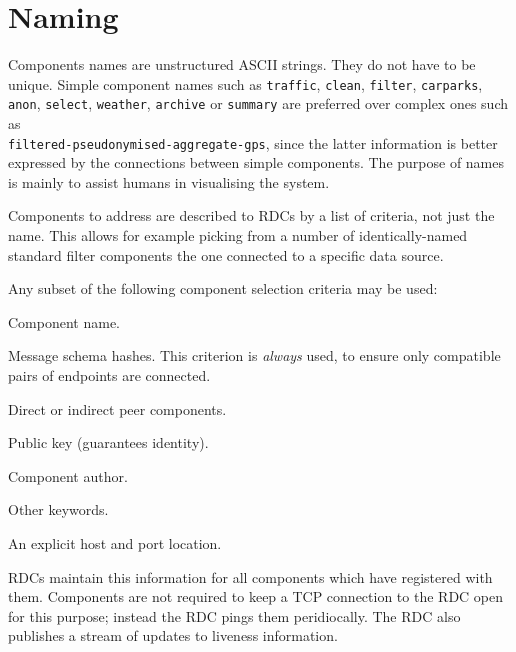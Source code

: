 \documentclass[12pt,a4paper,twoside]{article}
\renewcommand{\_}{\texttt{\symbol{95}}}
\begin{document}
\section{Naming}

Components names are unstructured ASCII strings. They do not have to
be unique. Simple component names such as
\verb^traffic^, \verb^clean^, \verb^filter^, \verb^carparks^,
\verb^anon^, \verb^select^, \verb^weather^, \verb^archive^ or
\verb^summary^ are preferred over complex ones such as\\
\verb^filtered-pseudonymised-aggregate-gps^, since the latter
information is better expressed by the connections between simple
components.
The purpose of names is mainly to assist humans in
visualising the system.

Components to address are described to RDCs by a list of
criteria, not just the name. This allows for example picking from
a number of identically-named standard filter components the one
connected to a specific data source.

Any subset of the following component selection criteria
may be used:
\begin{bulletlist}
\item Component name.
\item Message schema hashes.
This criterion is \textit{always} used, to ensure only
compatible pairs of endpoints are connected.
\item Direct or indirect peer components.
\item Public key (guarantees identity).
\item Component author.
\item Other keywords.
\item An explicit host and port location.
\end{bulletlist}

RDCs maintain this information for all components which have registered
with them. Components are not required to keep a TCP connection to
the RDC open for this purpose; instead the RDC pings them peridiocally.
The RDC also publishes a stream of updates to liveness information.
\end{document}
